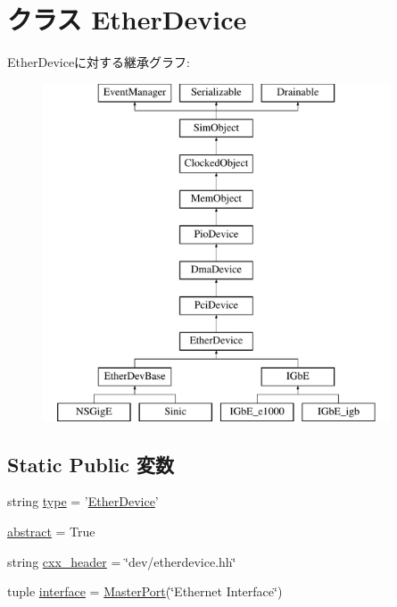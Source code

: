\hypertarget{classEthernet_1_1EtherDevice}{
\section{クラス EtherDevice}
\label{classEthernet_1_1EtherDevice}
}
EtherDeviceに対する継承グラフ:\begin{figure}[H]
\begin{center}
\leavevmode
\includegraphics[height=10cm]{classEthernet_1_1EtherDevice}
\end{center}
\end{figure}
\subsection*{Static Public 変数}
\begin{DoxyCompactItemize}
\item 
string \hyperlink{classEthernet_1_1EtherDevice_acce15679d830831b0bbe8ebc2a60b2ca}{type} = '\hyperlink{classEthernet_1_1EtherDevice}{EtherDevice}'
\item 
\hyperlink{classEthernet_1_1EtherDevice_a17fa61ac3806b481cafee5593b55e5d0}{abstract} = True
\item 
string \hyperlink{classEthernet_1_1EtherDevice_a17da7064bc5c518791f0c891eff05fda}{cxx\_\-header} = \char`\"{}dev/etherdevice.hh\char`\"{}
\item 
tuple \hyperlink{classEthernet_1_1EtherDevice_af9cf0e7acbdb5b49454aa3e590baa5f5}{interface} = \hyperlink{classm5_1_1params_1_1MasterPort}{MasterPort}(\char`\"{}Ethernet Interface\char`\"{})
\end{DoxyCompactItemize}


